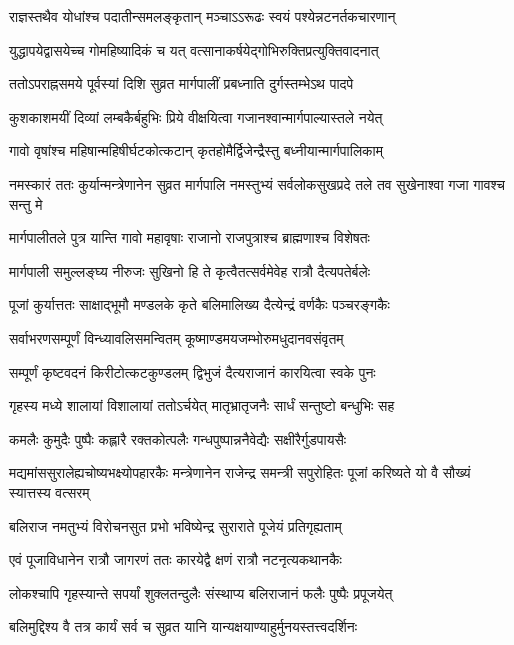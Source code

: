 \twolineshloka
{राज्ञस्तथैव योधांश्च पदातीन्समलङ्कृतान्}
{मञ्चाऽऽरूढः स्वयं पश्येन्नटनर्तकचारणान्} %

\twolineshloka
{युद्धापयेद्वासयेच्च गोमहिष्यादिकं च यत्}
{वत्सानाकर्षयेद्गोभिरुक्तिप्रत्युक्तिवादनात्} %

\twolineshloka
{ततोऽपराह्नसमये पूर्वस्यां दिशि सुव्रत}
{मार्गपालीं प्रबध्नाति दुर्गस्तम्भेऽथ पादपे} %

\twolineshloka
{कुशकाशमयीं दिव्यां लम्बकैर्बहुभिः प्रिये}
{वीक्षयित्वा गजानश्वान्मार्गपाल्यास्तले नयेत्} %

\twolineshloka
{गावो वृषांश्च महिषान्महिषीर्घटकोत्कटान्}
{कृतहोमैर्द्विजेन्द्रैस्तु बध्नीयान्मार्गपालिकाम्} %

\threelineshloka
{नमस्कारं ततः कुर्यान्मन्त्रेणानेन सुव्रत}
{मार्गपालि नमस्तुभ्यं सर्वलोकसुखप्रदे}
{तले तव सुखेनाश्वा गजा गावश्च सन्तु मे} %

\twolineshloka
{मार्गपालीतले पुत्र यान्ति गावो महावृषाः}
{राजानो राजपुत्राश्च ब्राह्मणाश्च विशेषतः} %

\twolineshloka
{मार्गपाली समुल्लङ्घ्य नीरुजः सुखिनो हि ते}
{कृत्वैतत्सर्वमेवेह रात्रौ दैत्यपतेर्बलेः} %

\twolineshloka
{पूजां कुर्यात्ततः साक्षाद्भूमौ मण्डलके कृते}
{बलिमालिख्य दैत्येन्द्रं वर्णकैः पञ्चरङ्गकैः} %

\twolineshloka
{सर्वाभरणसम्पूर्णं विन्ध्यावलिसमन्वितम्}
{कूष्माण्डमयजम्भोरुमधुदानवसंवृतम्} %

\twolineshloka
{सम्पूर्णं कृष्टवदनं किरीटोत्कटकुण्डलम्}
{द्विभुजं दैत्यराजानं कारयित्वा स्वके पुनः} %

\twolineshloka
{गृहस्य मध्ये शालायां विशालायां ततोऽर्चयेत्}
{मातृभ्रातृजनैः सार्धं सन्तुष्टो बन्धुभिः सह} %

\twolineshloka
{कमलैः कुमुदैः पुष्पैः कह्लारै रक्तकोत्पलैः}
{गन्धपुष्पान्ननैवेद्यैः सक्षीरैर्गुडपायसैः} %

\threelineshloka
{मद्यमांससुरालेह्यचोष्यभक्ष्योपहारकैः}
{मन्त्रेणानेन राजेन्द्र समन्त्री सपुरोहितः}
{पूजां करिष्यते यो वै सौख्यं स्यात्तस्य वत्सरम्} %

\twolineshloka
{बलिराज नमतुभ्यं विरोचनसुत प्रभो}
{भविष्येन्द्र सुराराते पूजेयं प्रतिगृह्यताम्} %

\twolineshloka
{एवं पूजाविधानेन रात्रौ जागरणं ततः}
{कारयेद्वै क्षणं रात्रौ नटनृत्यकथानकैः} %

\twolineshloka
{लोकश्चापि गृहस्यान्ते सपर्यां शुक्लतन्दुलैः}
{संस्थाप्य बलिराजानं फलैः पुष्पैः प्रपूजयेत्} %

\twolineshloka
{बलिमुद्दिश्य वै तत्र कार्यं सर्व च सुव्रत}
{यानि यान्यक्षयाण्याहुर्मुनयस्तत्त्वदर्शिनः} %

